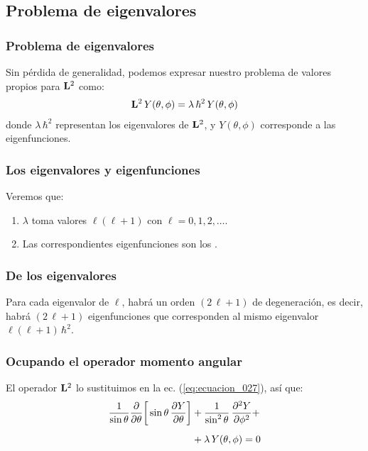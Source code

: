 \documentclass[12pt]{beamer}
\begin{document}
\subsection{Problema de eigenvalores}

\begin{frame}
\frametitle{Problema de eigenvalores}
Sin pérdida de generalidad, podemos expresar nuestro problema de valores propios para $\vb{L}^{2}$ como:
\pause
\begin{align}
\vb{L}^{2} \, Y(\theta, \phi) = \lambda \, \hbar^{2} \, Y(\theta, \phi)
\label{eq:ecuacion_027}
\end{align}
\pause
donde $\lambda \, \hbar^{2}$ representan los eigenvalores de $\vb{L}^{2}$, \pause y $Y(\theta, \phi)$ corresponde a las eigenfunciones. 
\end{frame}
\begin{frame}
\frametitle{Los eigenvalores y eigenfunciones}
Veremos que:
\pause
{}
\begin{enumerate}[<+->]
\item $\lambda$ toma valores $\ell (\ell + 1)$ con $\ell = 0, 1, 2, \ldots$.
\item Las correspondientes eigenfunciones son los \textbf{}.
\end{enumerate}
\end{frame}
\begin{frame}
\frametitle{De los eigenvalores}
Para cada eigenvalor de $\ell$, habrá un orden $(2 \, \ell + 1)$ de degeneración, \pause es decir, habrá $(2 \, \ell + 1)$ eigenfunciones que corresponden al mismo eigenvalor $\ell (\ell + 1) \, \hbar^{2}$.
\end{frame}
\begin{frame}
\frametitle{Ocupando el operador momento angular}
El operador $\vb{L}^{2}$ lo sustituimos en la ec. (\ref{eq:ecuacion_027}), así que:
\pause
\begin{align}
\begin{aligned}
\dfrac{1}{\sin \theta} \pdv{\theta} \bigg[ \sin \theta \, \pdv{Y}{\theta} \bigg] &+ \dfrac{1}{\sin^{2} \theta} \, \pdv[2]{Y}{\phi} + \\[0.5em]
&+ \lambda \, Y(\theta, \phi) = 0
\end{aligned}
\end{align}
\end{frame}
\end{document}
